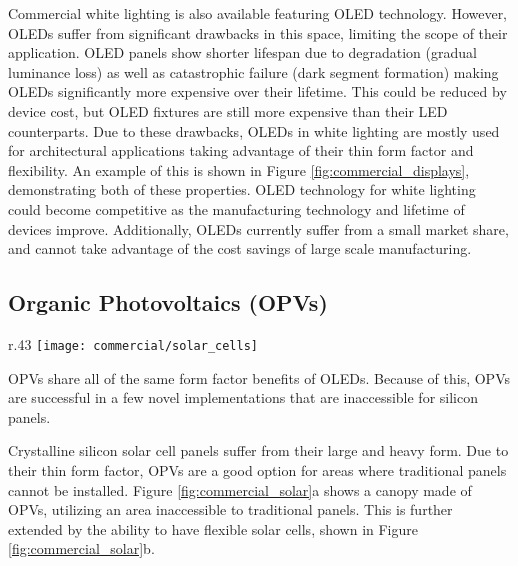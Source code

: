 \documentclass[../thesis.tex]{subfiles}
\begin{document}
Commercial white lighting is also available featuring OLED technology.
However, OLEDs suffer from significant drawbacks in this space, limiting the scope of their application.\supercite{Statt2016}
OLED panels show shorter lifespan due to degradation (gradual luminance loss) as well as catastrophic failure (dark segment formation) making OLEDs significantly more expensive over their lifetime.
This could be reduced by device cost, but OLED fixtures are still more expensive than their LED counterparts.
Due to these drawbacks, OLEDs in white lighting are mostly used for architectural applications taking advantage of their thin form factor and flexibility.\supercite{OLEDWorks,Evangeline2018}
An example of this is shown in Figure \ref{fig:commercial_displays}, demonstrating both of these properties.\supercite{Statt2016}
OLED technology for white lighting could become competitive as the manufacturing technology and lifetime of devices improve.
Additionally, OLEDs currently suffer from a small market share, and cannot take advantage of the cost savings of large scale manufacturing.



\subsection{Organic Photovoltaics (OPVs)}

\begin{wrapfigure}{r}{.43\textwidth}
\centering
\texttt{[image: commercial/solar\_cells]}
\caption{a. Belectric solar cells. b. Transparent solar cell from Michigan State University.  c. Flexible solar cell from InfinityPV.}
\label{fig:commercial_solar}
\end{wrapfigure}

OPVs share all of the same form factor benefits of OLEDs.  
Because of this, OPVs are successful in a few novel implementations that are inaccessible for silicon panels.\supercite{Schlenker2011,Sapkota2014,Kenning2017,Gregg2003,Peumans2003}

Crystalline silicon solar cell panels suffer from their large and heavy form.
Due to their thin form factor, OPVs are a good option for areas where traditional panels cannot be installed.\supercite{FitzgeraldWeaver2017,Wesoff2014}
Figure \ref{fig:commercial_solar}a shows a canopy made of OPVs, utilizing an area inaccessible to traditional panels.
This is further extended by the ability to have flexible solar cells, shown in Figure \ref{fig:commercial_solar}b.\supercite{InfinityPV2018}
\end{document}

